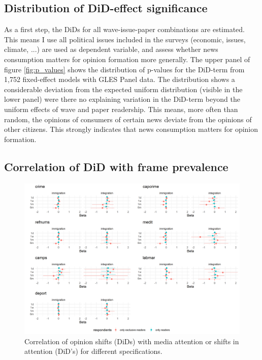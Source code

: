 \documentclass{article}
\begin{document}
\subsection{Distribution of DiD-effect significance}

As a first step, the DiDs for all wave-issue-paper combinations are estimated. This means I use all political issues included in the surveys (economic, issues, climate, ...) are used as dependent variable, and assess whether news consumption matters for opinion formation more generally. The upper panel of figure \ref{fig:p_values} shows the distribution of p-values for the DiD-term from 1,752 fixed-effect models with GLES Panel data. The distribution shows a considerable deviation from the expected uniform distribution (visible in the lower panel) were there no explaining variation in the DiD-term beyond the uniform effects of wave and paper readership. This means, more often than random, the opinions of consumers of certain news deviate from the opinions of other citizens. This strongly indicates that news consumption matters for opinion formation.




\subsection{Correlation of DiD with frame prevalence}
\begin{figure}[!ht]
    \centering
    \includegraphics[width=\textwidth]{paper/vis/effectplot_frames_did.png}
    \caption{Correlation of opinion shifts (DiDs) with media attention or shifts in attention (DiD's) for different specifications.}
    \label{fig:did_corr}
\end{figure}
\end{document}
